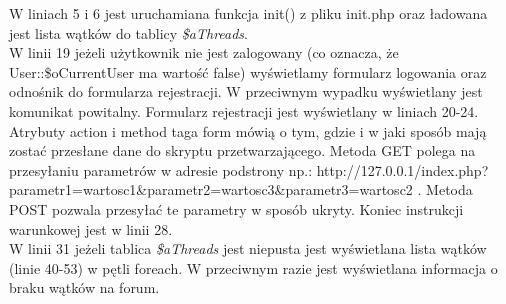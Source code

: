 \documentclass[a4paper,10pt]{article}
\begin{document}
{\begin{verbatim}
\end{verbatim}
W liniach 5 i 6 jest uruchamiana funkcja init() z pliku init.php oraz ładowana jest lista wątków do tablicy \textit{\$aThreads}.\\
W linii 19 jeżeli użytkownik nie jest zalogowany (co oznacza, że User::\$oCurrentUser ma wartość false) wyświetlamy formularz logowania oraz odnośnik do formularza rejestracji. W przeciwnym wypadku wyświetlany jest komunikat powitalny. Formularz rejestracji jest wyświetlany w liniach 20-24. Atrybuty action i method taga form mówią o tym, gdzie i w jaki sposób mają zostać przesłane dane do skryptu przetwarzającego. Metoda GET polega na przesyłaniu parametrów w adresie podstrony np.: http://127.0.0.1/index.php?parametr1=wartosc1\&parametr2=wartosc3\&parametr3=wartosc2 . Metoda POST pozwala przesyłać te parametry w sposób ukryty.
Koniec instrukcji warunkowej jest w linii 28. \\
W linii 31 jeżeli tablica \textit{\$aThreads} jest niepusta jest wyświetlana lista wątków (linie 40-53) w pętli foreach. W przeciwnym razie jest wyświetlana informacja o braku wątków na forum.
}
\end{document}
